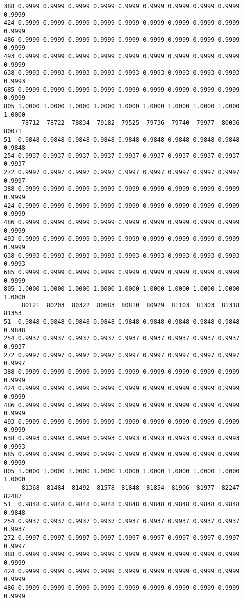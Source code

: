 \documentclass[
]{report}
\begin{document}
\begin{verbatim}
388 0.9999 0.9999 0.9999 0.9999 0.9999 0.9999 0.9999 0.9999 0.9999 0.9999
424 0.9999 0.9999 0.9999 0.9999 0.9999 0.9999 0.9999 0.9999 0.9999 0.9999
486 0.9999 0.9999 0.9999 0.9999 0.9999 0.9999 0.9999 0.9999 0.9999 0.9999
493 0.9999 0.9999 0.9999 0.9999 0.9999 0.9999 0.9999 0.9999 0.9999 0.9999
638 0.9993 0.9993 0.9993 0.9993 0.9993 0.9993 0.9993 0.9993 0.9993 0.9993
685 0.9999 0.9999 0.9999 0.9999 0.9999 0.9999 0.9999 0.9999 0.9999 0.9999
805 1.0000 1.0000 1.0000 1.0000 1.0000 1.0000 1.0000 1.0000 1.0000 1.0000
     78712  78722  78834  79182  79525  79736  79740  79977  80036  80071
51  0.9848 0.9848 0.9848 0.9848 0.9848 0.9848 0.9848 0.9848 0.9848 0.9848
254 0.9937 0.9937 0.9937 0.9937 0.9937 0.9937 0.9937 0.9937 0.9937 0.9937
272 0.9997 0.9997 0.9997 0.9997 0.9997 0.9997 0.9997 0.9997 0.9997 0.9997
388 0.9999 0.9999 0.9999 0.9999 0.9999 0.9999 0.9999 0.9999 0.9999 0.9999
424 0.9999 0.9999 0.9999 0.9999 0.9999 0.9999 0.9999 0.9999 0.9999 0.9999
486 0.9999 0.9999 0.9999 0.9999 0.9999 0.9999 0.9999 0.9999 0.9999 0.9999
493 0.9999 0.9999 0.9999 0.9999 0.9999 0.9999 0.9999 0.9999 0.9999 0.9999
638 0.9993 0.9993 0.9993 0.9993 0.9993 0.9993 0.9993 0.9993 0.9993 0.9993
685 0.9999 0.9999 0.9999 0.9999 0.9999 0.9999 0.9999 0.9999 0.9999 0.9999
805 1.0000 1.0000 1.0000 1.0000 1.0000 1.0000 1.0000 1.0000 1.0000 1.0000
     80121  80203  80322  80683  80810  80929  81103  81303  81318  81353
51  0.9848 0.9848 0.9848 0.9848 0.9848 0.9848 0.9848 0.9848 0.9848 0.9848
254 0.9937 0.9937 0.9937 0.9937 0.9937 0.9937 0.9937 0.9937 0.9937 0.9937
272 0.9997 0.9997 0.9997 0.9997 0.9997 0.9997 0.9997 0.9997 0.9997 0.9997
388 0.9999 0.9999 0.9999 0.9999 0.9999 0.9999 0.9999 0.9999 0.9999 0.9999
424 0.9999 0.9999 0.9999 0.9999 0.9999 0.9999 0.9999 0.9999 0.9999 0.9999
486 0.9999 0.9999 0.9999 0.9999 0.9999 0.9999 0.9999 0.9999 0.9999 0.9999
493 0.9999 0.9999 0.9999 0.9999 0.9999 0.9999 0.9999 0.9999 0.9999 0.9999
638 0.9993 0.9993 0.9993 0.9993 0.9993 0.9993 0.9993 0.9993 0.9993 0.9993
685 0.9999 0.9999 0.9999 0.9999 0.9999 0.9999 0.9999 0.9999 0.9999 0.9999
805 1.0000 1.0000 1.0000 1.0000 1.0000 1.0000 1.0000 1.0000 1.0000 1.0000
     81368  81484  81492  81578  81848  81854  81906  81977  82247  82487
51  0.9848 0.9848 0.9848 0.9848 0.9848 0.9848 0.9848 0.9848 0.9848 0.9848
254 0.9937 0.9937 0.9937 0.9937 0.9937 0.9937 0.9937 0.9937 0.9937 0.9937
272 0.9997 0.9997 0.9997 0.9997 0.9997 0.9997 0.9997 0.9997 0.9997 0.9997
388 0.9999 0.9999 0.9999 0.9999 0.9999 0.9999 0.9999 0.9999 0.9999 0.9999
424 0.9999 0.9999 0.9999 0.9999 0.9999 0.9999 0.9999 0.9999 0.9999 0.9999
486 0.9999 0.9999 0.9999 0.9999 0.9999 0.9999 0.9999 0.9999 0.9999 0.9999

\end{verbatim}
\end{document}
